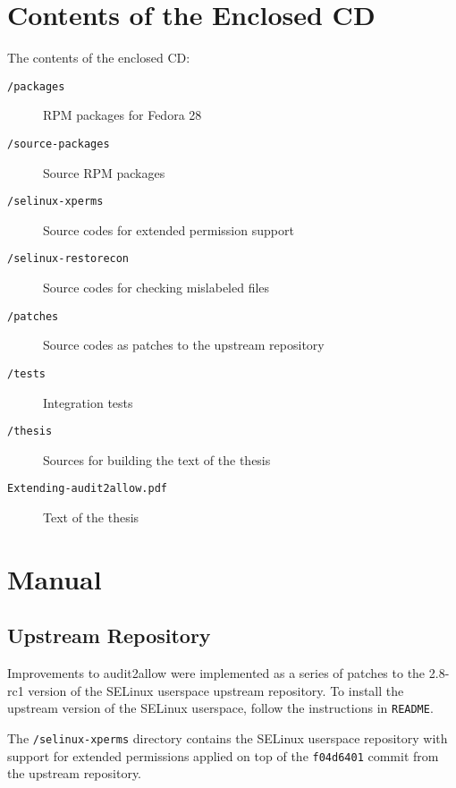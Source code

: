 
\chapter{Contents of the Enclosed CD}

The contents of the enclosed CD:
\begin{description}
    \item [\texttt{/packages}] RPM packages for Fedora 28
    \item [\texttt{/source-packages}] Source RPM packages
    \item [\texttt{/selinux-xperms}] Source codes for extended permission support
    \item [\texttt{/selinux-restorecon}] Source codes for checking mislabeled
        files
    \item [\texttt{/patches}] Source codes as patches to the upstream
        repository
    \item [\texttt{/tests}] Integration tests
    \item [\texttt{/thesis}] Sources for building the text of the thesis
    \item [\texttt{Extending-audit2allow.pdf}] Text of the thesis
\end{description}

\chapter{Manual}

\section{Upstream Repository}

Improvements to audit2allow were implemented as a series of patches to the
2.8-rc1 version of the SELinux userspace upstream repository. To install the
upstream version of the SELinux userspace, follow the instructions in
\texttt{README}.

The \texttt{/selinux-xperms} directory contains the SELinux userspace repository
with support for extended permissions applied on top of the \texttt{f04d6401}
commit from the upstream repository.

